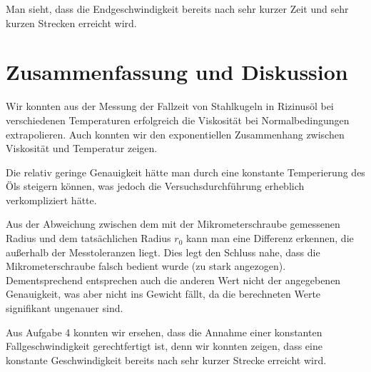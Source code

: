 \documentclass[a4paper,german,12pt,smallheadings]{scrartcl}
\begin{document}
Man sieht, dass die Endgeschwindigkeit bereits nach sehr kurzer Zeit und sehr
kurzen Strecken erreicht wird.

\section*{Zusammenfassung und Diskussion}

Wir konnten aus der Messung der Fallzeit von Stahlkugeln in Rizinusöl bei
verschiedenen Temperaturen erfolgreich die Viskosität bei Normalbedingungen
extrapolieren. Auch konnten wir den exponentiellen Zusammenhang zwischen
Viskosität und Temperatur zeigen.

Die relativ geringe Genauigkeit hätte man durch eine konstante Temperierung des
Öls steigern können, was jedoch die Versuchsdurchführung erheblich
verkompliziert hätte.

Aus der Abweichung zwischen dem mit der Mikrometerschraube gemessenen Radius
und dem tatsächlichen Radius $r_0$ kann man eine Differenz erkennen, die
außerhalb der Messtoleranzen liegt. Dies legt den Schluss nahe, dass die
Mikrometerschraube falsch bedient wurde (zu stark angezogen).
Dementsprechend entsprechen auch die anderen Wert nicht der angegebenen
Genauigkeit, was aber nicht ins Gewicht fällt, da die berechneten Werte
signifikant ungenauer sind.

Aus Aufgabe 4 konnten wir ersehen, dass die Annahme einer konstanten
Fallgeschwindigkeit gerechtfertigt ist, denn wir konnten zeigen, dass eine
konstante Geschwindigkeit bereits nach sehr kurzer Strecke erreicht wird.

\begin{landscape}
  
\end{landscape}
\end{document}
